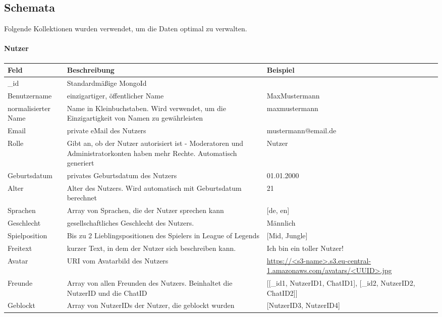 \subsection{Schemata}
Folgende Kollektionen wurden verwendet, um die Daten optimal zu verwalten.

\paragraph{Nutzer}
\begin{center}
    \begin{tabularx}{\textwidth}{ |X|X|X| } 
     \hline
     Feld & Beschreibung & Beispiel \\ 
     \hline
      \_id & Standardmäßige MongoId & \\
      Benutzername & einzigartiger, öffentlicher Name & MaxMustermann \\ 
      normalisierter Name & Name in Kleinbuchstaben. Wird verwendet, um die Einzigartigkeit von Namen zu gewährleisten & maxmustermann \\ 
      Email & private eMail des Nutzers & mustermann@email.de \\
      Rolle & Gibt an, ob der Nutzer autorisiert ist - Moderatoren und Administratorkonten haben mehr Rechte. Automatisch generiert & Nutzer \\ 
      Geburtsdatum & privates Geburtsdatum des Nutzers & 01.01.2000 \\ 
      Alter & Alter des Nutzers. Wird automatisch mit Geburtsdatum berechnet & 21 \\ 
      Sprachen & Array von Sprachen, die der Nutzer sprechen kann & {[de, en]} \\
      Geschlecht & gesellschaftliches Geschlecht des Nutzers. & Männlich \\ 
      Spielposition & Bis zu 2 Lieblingspositionen des Spielers in League of Legends & {[Mid, Jungle]} \\ 
      Freitext & kurzer Text, in dem der Nutzer sich beschreiben kann. & Ich bin ein toller Nutzer! \\
      Avatar & URI vom Avatarbild des Nutzers & \url{https://<s3-name>.s3.eu-central-1.amazonaws.com/avatars/<UUID>.jpg} \\ 
      Freunde & Array von allen Freunden des Nutzers. Beinhaltet die NutzerID und die ChatID & {[[\_id1, NutzerID1, ChatID1], [\_id2, NutzerID2, ChatID2]]}\\ 
      Geblockt & Array von NutzerIDs der Nutzer, die geblockt wurden & {[NutzerID3, NutzerID4]} \\ 
     \hline
    \end{tabularx}
\end{center}

